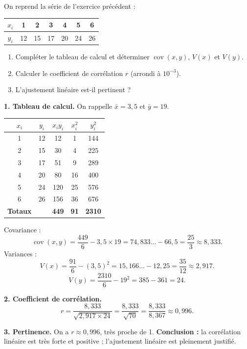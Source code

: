\documentclass[11pt]{article}
\begin{document}
\begin{exoresolu}
On reprend la série de l'exercice précédent :
\begin{center}
\begin{tabular}{|c|cccccc|}
\hline
\rowcolor{popblueL} $x_i$ & 1 & 2 & 3 & 4 & 5 & 6 \\
\hline
$y_i$ & 12 & 15 & 17 & 20 & 24 & 26 \\
\hline
\end{tabular}
\end{center}
\begin{enumerate}
\item Compléter le tableau de calcul et déterminer $\operatorname{cov}(x,y)$, $V(x)$ et $V(y)$.
\item Calculer le coefficient de corrélation $r$ (arrondi à $10^{-3}$).
\item L'ajustement linéaire est-il pertinent ?
\end{enumerate}
\tcblower
\textbf{1. Tableau de calcul.} On rappelle $\bar{x} = 3{,}5$ et $\bar{y} = 19$.
\begin{center}
\begin{tabular}{|c|c|c|c|c|}
\hline
\rowcolor{popblueL} $x_i$ & $y_i$ & $x_i y_i$ & $x_i^2$ & $y_i^2$ \\
\hline
1 & 12 & 12 & 1 & 144 \\
2 & 15 & 30 & 4 & 225 \\
3 & 17 & 51 & 9 & 289 \\
4 & 20 & 80 & 16 & 400 \\
5 & 24 & 120 & 25 & 576 \\
6 & 26 & 156 & 36 & 676 \\
\hline
\textbf{Totaux} & & \textbf{449} & \textbf{91} & \textbf{2310} \\
\hline
\end{tabular}
\end{center}
Covariance :
\[ \operatorname{cov}(x,y) = \frac{449}{6} - 3{,}5 \times 19 = 74{,}833\ldots - 66{,}5 = \frac{25}{3} \approx 8{,}333. \]
Variances :
\[ V(x) = \frac{91}{6} - (3{,}5)^2 = 15{,}166\ldots - 12{,}25 = \frac{35}{12} \approx 2{,}917. \]
\[ V(y) = \frac{2310}{6} - 19^2 = 385 - 361 = 24. \]

\textbf{2. Coefficient de corrélation.}
\[ r = \frac{8{,}333}{\sqrt{2{,}917 \times 24}} = \frac{8{,}333}{\sqrt{70}} = \frac{8{,}333}{8{,}367} \approx 0{,}996. \]

\textbf{3. Pertinence.} On a $r \approx 0{,}996$, très proche de 1.
\textbf{Conclusion :} la corrélation linéaire est très forte et positive ; l'ajustement linéaire est pleinement justifié.
\end{exoresolu}
\end{document}
